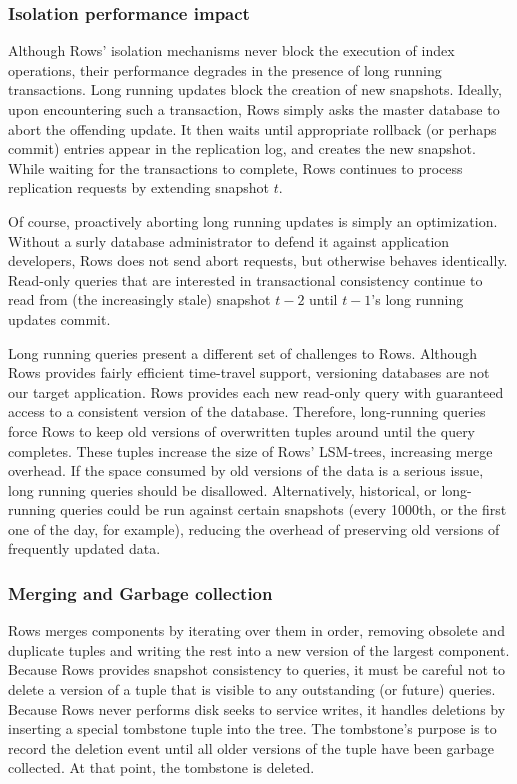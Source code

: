 \documentclass{sig-alternate-sigmod08}
\newcommand{\rows}{Rows\xspace}
\newcommand{\rowss}{Rows'\xspace}
\begin{document}
\subsubsection{Isolation performance impact}

Although \rowss isolation mechanisms never block the execution of
index operations, their performance degrades in the presence of long
running transactions. Long running updates block the creation of new
snapshots.  Ideally, upon encountering such a transaction, \rows
simply asks the master database to abort the offending update.  It
then waits until appropriate rollback (or perhaps commit) entries
appear in the replication log, and creates the new snapshot.  While
waiting for the transactions to complete, \rows continues to process
replication requests by extending snapshot $t$.

Of course, proactively aborting long running updates is simply an
optimization.  Without a surly database administrator to defend it
against application developers, \rows does not send abort requests,
but otherwise behaves identically.  Read-only queries that are
interested in transactional consistency continue to read from (the
increasingly stale) snapshot $t-2$ until $t-1$'s long running
updates commit.

Long running queries present a different set of challenges to \rows.
Although \rows provides fairly efficient time-travel support,
versioning databases are not our target application.  \rows
provides each new read-only query with guaranteed access to a
consistent version of the database.  Therefore, long-running queries
force \rows to keep old versions of overwritten tuples around until
the query completes.  These tuples increase the size of \rowss
LSM-trees, increasing merge overhead.  If the space consumed by old
versions of the data is a serious issue, long running queries should
be disallowed.  Alternatively, historical, or long-running queries
could be run against certain snapshots (every 1000th, or the first
one of the day, for example), reducing the overhead of preserving
old versions of frequently updated data.

\subsubsection{Merging and Garbage collection}

\rows merges components by iterating over them in order, removing
obsolete and duplicate tuples and writing the rest into a new version
of the largest component.  Because \rows provides snapshot consistency
to queries, it must be careful not to delete a version of a tuple that
is visible to any outstanding (or future) queries.  Because \rows
never performs disk seeks to service writes, it handles deletions by
inserting a special tombstone tuple into the tree.  The tombstone's
purpose is to record the deletion event until all older versions of
the tuple have been garbage collected.  At that point, the tombstone
is deleted.
\end{document}
